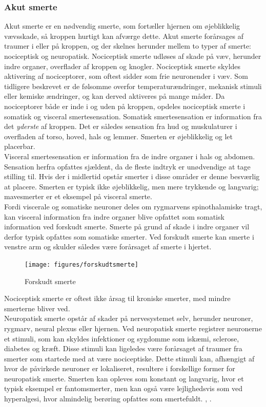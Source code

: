 \subsubsection{Akut smerte}
Akut smerte er en nødvendig smerte, som fortæller hjernen om øjeblikkelig vævsskade, så kroppen hurtigt kan afværge dette. Akut smerte forårsages af traumer i eller på kroppen, og der skelnes herunder mellem to typer af smerte: nociceptisk og neuropatisk. Nociceptisk smerte udløses af skade på væv, herunder indre organer, overflader af kroppen og knogler. Nociceptisk smerte skyldes aktivering af nociceptorer, som oftest sidder som frie neuronender i væv. Som tidligere beskrevet er de følsomme overfor temperaturændringer, mekanisk stimuli eller kemiske ændringer, og kan derved aktiveres på mange måder. Da nociceptorer både er inde i og uden på kroppen, opdeles nociceptisk smerte i somatisk og visceral smertesensation. Somatisk smertesensation er information fra det \textit{yderste} af kroppen. Det er således sensation fra hud og muskulaturer i overfladen af torso, hoved, hals og lemmer. \citep{Martini} Smerten er øjeblikkelig og let placerbar. \\
Visceral smertesensation er information fra de indre organer i hals og abdomen. Sensation herfra opfattes sjældent, da de fleste indtryk er unødvendige at tage stilling til. Hvis der i midlertid opstår smerter i disse områder er denne besværlig at placere. Smerten er typisk ikke øjeblikkelig, men mere trykkende og langvarig; mavesmerter er et eksempel på visceral smerte. \\
Fordi viscerale og somatiske neuroner deles om rygmarvens spinothalamiske tragt, kan visceral information fra indre organer blive opfattet som somatisk information ved forskudt smerte. Smerte på grund af skade i indre organer vil derfor typisk opfattes som somatiske smerter. Ved forskudt smerte kan smerte i venstre arm og skulder således være forårsaget af smerte i hjertet.

\begin{figure}[H]
\begin{center}
\texttt{[image: figures/forskudtsmerte]}
	\caption{Forskudt smerte \citep{Martini}}
	\label{forskudtsmerte}
\end{center}
\end{figure}


Nociceptisk smerte er oftest ikke årsag til kroniske smerter, med mindre smerterne bliver ved.\\ 
Neuropatisk smerte opstår af skader på nervesystemet selv, herunder neuroner, rygmarv, neural plexus eller hjernen. 
Ved neuropatisk smerte registrer neuronerne et stimuli, som kan skyldes infektioner og sygdomme som iskæmi, sclerose, diabetes og kræft. Disse stimuli kan ligeledes være forårsaget af traumer fra smerter som startede med at være nociceptiske. Dette stimuli kan, afhængigt af hvor de påvirkede neuroner er lokaliseret, resultere i forskellige former for neuropatisk smerte. Smerten kan opleves som konstant og langvarig, hvor et typisk eksempel er fantomsmerter, men kan også være lejlighedsvis som ved hyperalgesi, hvor almindelig berøring opfattes som smertefuldt. \citep{Giangregorio1997}, \citep{Carmon}.

